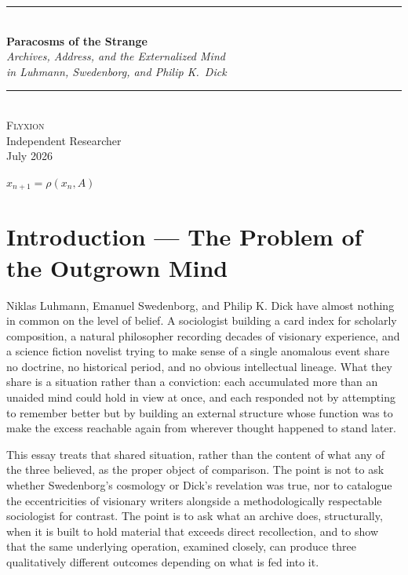 \documentclass[11pt]{article}
\begin{document}
\begin{titlepage}
  \pagecolor{RSVPdeep}
  \color{white}
  \thispagestyle{empty}
  \vspace*{4cm}
  \begin{center}
    {\color{RSVPaccent}\rule{0.6\linewidth}{1.5pt}}\\[1.2em]
    {\fontsize{32}{38}\selectfont\bfseries Paracosms of the Strange}\\[0.8em]
    {\color{RSVPlight}\Large\itshape
      Archives, Address, and the Externalized Mind\\
      in Luhmann, Swedenborg, and Philip K.\ Dick}\\[1.2em]
    {\color{RSVPaccent}\rule{0.6\linewidth}{1.5pt}}\\[2em]
    {\Large\scshape Flyxion}\\[0.4em]
    {\color{RSVPlight!70}\normalsize Independent Researcher}\\[1.5em]
    {\small\color{RSVPlight!50} July 2026}
  \end{center}
  \vfill
  \begin{center}
    {\color{RSVPaccent}\Large $x_{n+1} = \rho(x_n, A)$}
  \end{center}
\end{titlepage}
\nopagecolor
\clearpage
{}

\section{Introduction --- The Problem of the Outgrown Mind}

Niklas Luhmann, Emanuel Swedenborg, and Philip K. Dick have almost nothing in common on the level of belief. A sociologist building a card index for scholarly composition, a natural philosopher recording decades of visionary experience, and a science fiction novelist trying to make sense of a single anomalous event share no doctrine, no historical period, and no obvious intellectual lineage. What they share is a situation rather than a conviction: each accumulated more than an unaided mind could hold in view at once, and each responded not by attempting to remember better but by building an external structure whose function was to make the excess reachable again from wherever thought happened to stand later.

This essay treats that shared situation, rather than the content of what any of the three believed, as the proper object of comparison. The point is not to ask whether Swedenborg's cosmology or Dick's revelation was true, nor to catalogue the eccentricities of visionary writers alongside a methodologically respectable sociologist for contrast. The point is to ask what an archive does, structurally, when it is built to hold material that exceeds direct recollection, and to show that the same underlying operation, examined closely, can produce three qualitatively different outcomes depending on what is fed into it.
\end{document}
